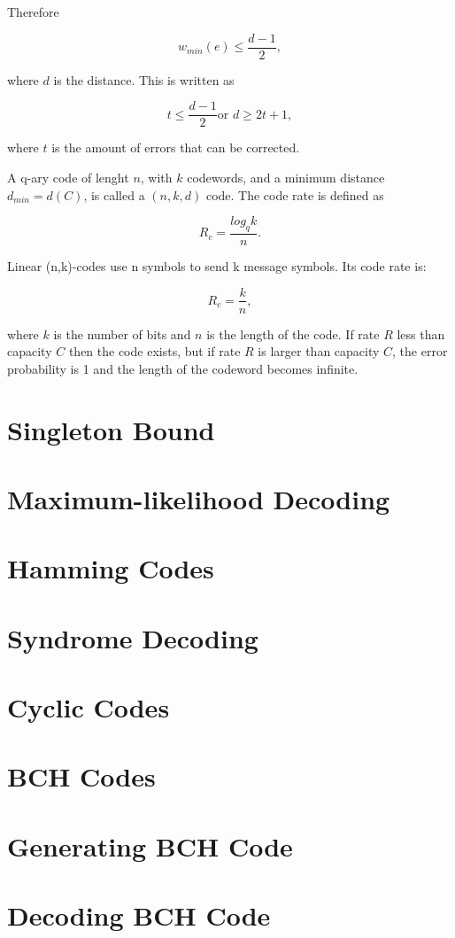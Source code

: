 \documentclass[../main.tex]{subfiles}
\begin{document}
    \noindent
    Therefore

    \begin{equation*}
         w_{min}(e) \leq \frac{d-1}{2},
    \end{equation*}

    \noindent
    where $d$ is the distance. This is written as

    \begin{equation*}
        t \leq \frac{d-1}{2} \text{or } d \geq 2t+1,
    \end{equation*}

    \noindent
    where $t$ is the amount of errors that can be corrected.


    A q-ary code of lenght $n$, with $k$ codewords, and a minimum distance $d_{min}=d(C)$, is called a $(n,k,d)$ code. The code rate is defined as

    \begin{equation*}
        R_c=\frac{log_qk}{n}.
    \end{equation*}

    \noindent
    Linear (n,k)-codes use n symbols to send k message symbols. Its code rate is:

    \begin{equation*}
        R_c=\frac{k}{n},
    \end{equation*}

    \noindent
    where $k$ is the number of bits and $n$ is the length of the code. If rate $R$ less than capacity $C$ then the code exists, but if rate $R$ is larger than capacity $C$, the error probability is 1 and the length of the codeword becomes infinite.

    \section{Singleton Bound}


    \section{Maximum-likelihood Decoding}


    \section{Hamming Codes}


    \section{Syndrome Decoding}


    \section{Cyclic Codes}


    \section{BCH Codes}


    \section{Generating BCH Code}


    \section{Decoding BCH Code}
\end{document}
